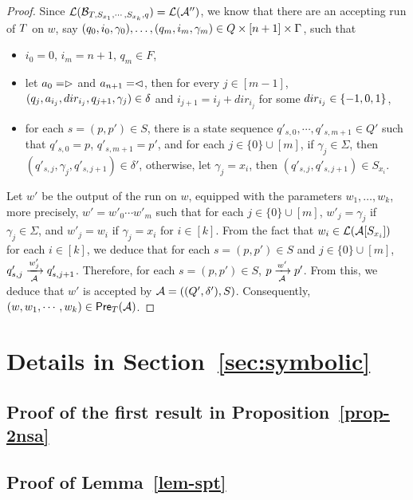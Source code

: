 \begin{proof}
Since $\mathcal{L}(\mathcal{B}_{T, S_{x_1}, \cdots, S_{x_k}, q})=\mathcal{L}(\mathcal{A}'')$, we know that  there are an accepting run of $T$ on $w$, 
say $(q_0, i_0, \gamma_0),\ldots, (q_m, i_m, \gamma_m) \in Q \times [n+1] \times \Gamma$, such that 
\begin{itemize}
\item $i_0=0$, $i_m = n+1$, $q_m \in F$, 
%
\item let $a_0 = \vartriangleright$ and $a_{n+1} = \vartriangleleft$,  then for every $j \in [m-1]$, $(q_j, a_{i_j}, dir_{i_j}, q_{j+1}, \gamma_j) \in
        \delta$ and $i_{j+1} = i_j + dir_{i_j}$ for some $dir_{i_j} \in \{-1, 0, 1\}$, 
 \item  for each $s=(p, p') \in S$, there is a state sequence $q'_{s, 0}, \cdots, q'_{s,m+1} \in Q'$ such that $q'_{s,0}= p$, $q'_{s, m+1} = p'$, and 
 for each $j \in \{0\} \cup [m]$, if $\gamma_j \in \Sigma$, then $(q'_{s, j}, \gamma_j, q'_{s, j+1}) \in \delta'$, otherwise, let $\gamma_j =x_i$, then $(q'_{s, j}, q'_{s, j+1}) \in S_{x_i}$.  
\end{itemize}
Let $w'$ be the output of the run on $w$, equipped with the parameters $w_1,\ldots, w_k$, more precisely, $w' = w'_0 \cdots w'_m$ such that for each $j \in \{0\} \cup [m]$, $w'_j = \gamma_j$ if $\gamma_j \in \Sigma$, and $w'_j = w_i$ if $\gamma_j = x_i$ for $i \in [k]$. From the fact that $w_i \in \mathcal{L}(\mathcal{A}[S_{x_i}])$ for each $i \in [k]$, we deduce that for each $s = (p,p') \in S$ and $j \in \{0\} \cup [m]$, $q'_{s, j} \xrightarrow[\mathcal{A}]{w'_j} q'_{s, j+1}$.
Therefore, for each $s = (p,p') \in S$, $p \xrightarrow[\mathcal{A}]{w'} p'$. From this, we deduce that $w'$ is accepted by $\mathcal{A}=((Q', \delta'), S)$.
Consequently, $(w, w_1,\cdots, w_k) \in \textsf{Pre}_{T}(\mathcal{A})$.
\end{proof}




\section{Details in Section~\ref{sec:symbolic}}\label{app-sym}

\subsection{Proof of the first result in Proposition~\ref{prop-2nsa}}

\subsection{Proof of Lemma~\ref{lem-spt}}